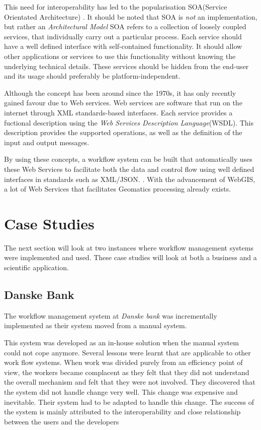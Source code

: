 \documentclass[12pt,a4paper]{report}
\begin{document}
This need for interoperability has led to the popularisation SOA(Service
Orientated Architecture) \cite{Sanders:2008:SSA:1400549.1400595}.  It should be
noted that SOA is \emph{not} an implementation, but rather an
\emph{Architectural Model} SOA refers to a collection of loosely coupled
services, that individually carry out a particular process. Each service should
have a well defined interface with self-contained functionality. It should
allow other applications or services to use this functionality without knowing
the underlying technical details. These services should be hidden from the
end-user and its usage should preferably be platform-independent.

Although the concept has been around since the 1970s, it has only recently
gained favour due to Web services.  Web services are software that run on the
internet through XML standards-based
interfaces\cite{Tai:2004:CCW:1045658.1045680}.  Each service provides a
fuctional description using the \emph{Web Services Description Language}(WSDL).
This description provides the supported operations, as well as the definition
of the input and output messages.

By using these concepts, a workflow system can be built that automatically uses
these Web Services to facilitate both the data and control flow using well
defined interfaces in standards such as XML/JSON.
\cite{Shegalov:2001:XWM:767132.767139}. With the advancement of WebGIS, a lot
of Web Services that facilitates Geomatics processing already exists.


\section{Case Studies}
The next section will look at two instances where workflow management systems
were implemented and used.  These case studies will look at both a business and
a scientific application.
    \subsection*{Danske Bank}
      The workflow management system at \emph{Danske bank} was incrementally
      implemented as their system moved from a manual
      system\cite{Brahe:2007:SWW:1316624.1316661}.

      This system was developed as an in-house solution when the manual system
      could not cope anymore.  Several lessons were learnt that are applicable
      to other work flow systems. When work was divided purely from an
      efficiency point of view, the workers became complacent as they felt that
      they did not understand the overall mechanism and felt that they were not
      involved. They discovered that the system did not handle change very
      well. This change was expensive and inevitable. Their system had to be
      adapted to handle this change. The success of the system is mainly
      attributed to the interoperability and close relationship between the
      users and the developers
\end{document}

